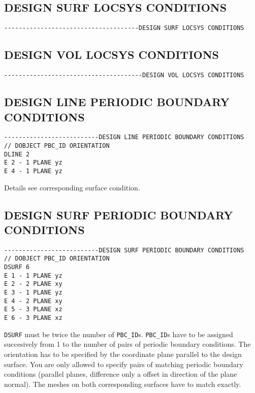 
\subsection{DESIGN SURF LOCSYS CONDITIONS}
\begin{verbatim}
-------------------------------------DESIGN SURF LOCSYS CONDITIONS
\end{verbatim}


\subsection{DESIGN VOL LOCSYS CONDITIONS}
\begin{verbatim}
--------------------------------------DESIGN VOL LOCSYS CONDITIONS
\end{verbatim}


\subsection{DESIGN LINE PERIODIC BOUNDARY CONDITIONS}

\begin{verbatim}
--------------------------DESIGN LINE PERIODIC BOUNDARY CONDITIONS
// DOBJECT PBC_ID ORIENTATION
DLINE 2
E 2 - 1 PLANE yz
E 4 - 1 PLANE yz
\end{verbatim}

Details see corresponding surface condition.

\subsection{DESIGN SURF PERIODIC BOUNDARY CONDITIONS}

\begin{verbatim}
--------------------------DESIGN SURF PERIODIC BOUNDARY CONDITIONS
// DOBJECT PBC_ID ORIENTATION
DSURF 6
E 1 - 1 PLANE yz
E 2 - 2 PLANE xy
E 3 - 1 PLANE yz
E 4 - 2 PLANE xy
E 5 - 3 PLANE xz
E 6 - 3 PLANE xz
\end{verbatim}

\verb$DSURF$ must be twice the number of \verb$PBC_ID$s. \verb$PBC_ID$s have
to be assigned succesively from 1 to the number of pairs of periodic boundary
conditions. The orientation has to be specified by the coordinate plane
parallel to the design surface.
You are only allowed to specify pairs of matching periodic boundary
conditions (parallel planes, difference only a offset in direction of the
plane normal).
The meshes on both corresponding surfaces have to match exactly.


